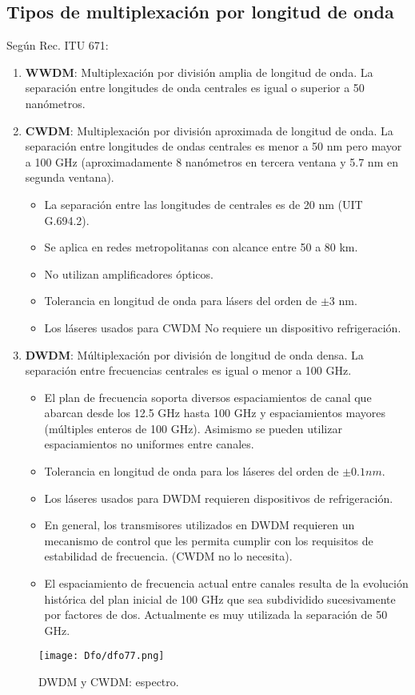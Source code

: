 \documentclass[
	12pt, %
	fleqn, %
	a4paper, %
	oneside, %
]{LegrandOrangeBook}
\begin{document}
\subsection{Tipos de multiplexación por longitud de onda}
Según Rec. ITU 671:
\begin{enumerate}
\item \textbf{WWDM}: Multiplexación por división amplia de longitud de onda. La separación entre longitudes de onda centrales es igual o superior a 50 nanómetros.
\item \textbf{CWDM}: Multiplexación por división aproximada de longitud de onda. La separación entre longitudes de ondas centrales es menor a 50 nm pero mayor a 100 GHz (aproximadamente 8 nanómetros en tercera ventana y 5.7 nm  en segunda ventana).
\begin{itemize}
\item La separación entre las longitudes de centrales es de 20 nm (UIT G.694.2). 
\item Se aplica en redes metropolitanas con alcance entre 50 a 80 km.  
\item No utilizan amplificadores ópticos.
\item Tolerancia en longitud de onda para lásers del orden de $\pm 3$ nm.
\item Los láseres usados para CWDM No requiere un dispositivo refrigeración. 
\end{itemize}
\item \textbf{DWDM}: Múltiplexación por división de longitud de onda densa. La separación entre frecuencias centrales es igual o menor a 100 GHz. 
\begin{itemize}
\item El plan de frecuencia soporta diversos espaciamientos de canal que abarcan desde los 12.5 GHz hasta 100 GHz y espaciamientos mayores (múltiples enteros de 100 GHz). Asimismo se pueden utilizar espaciamientos no uniformes entre canales.  
\item Tolerancia en longitud de onda para los láseres del orden de $\pm 0.1 nm$.
\item Los láseres usados para DWDM requieren dispositivos de refrigeración.
\item En general, los transmisores utilizados en DWDM requieren un mecanismo de control que les permita cumplir con los requisitos de estabilidad de frecuencia. (CWDM no lo necesita).
\item El espaciamiento de frecuencia actual entre canales resulta de la evolución histórica del plan inicial de 100 GHz que sea subdividido sucesivamente por factores de dos. Actualmente es muy utilizada la separación de 50 GHz.  
\end{itemize}
\end{enumerate}
\begin{figure}[H]
\centering
\texttt{[image: Dfo/dfo77.png]}
\caption{DWDM y CWDM: espectro.}
\end{figure}
\end{document}
